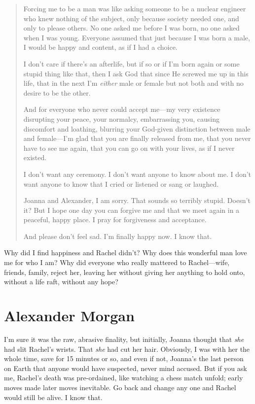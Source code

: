 \begin{quote}
Forcing me to be a man was like asking someone to be a nuclear engineer
who knew nothing of the subject, only because society needed one, and
only to please others. No one asked me before I was born, no one asked
when I was young. Everyone assumed that just because I was born a male,
I would be happy and content, as if I had a choice.

I don't care if there's an afterlife, but if so or if I'm born again or
some stupid thing like that, then I ask God that since He screwed me up
in this life, that in the next I'm \emph{either} male or female but not
both and with no desire to be the other.

And for everyone who never could accept me---my very existence
disrupting your peace, your normalcy, embarrassing you, causing
discomfort and loathing, blurring your God-given distinction between
male and female---I'm glad that you are finally released from me, that
you never have to see me again, that you can go on with your lives, as
if I never existed.

I don't want any ceremony. I don't want anyone to know about me. I don't
want anyone to know that I cried or listened or sang or laughed.

Joanna and Alexander, I am sorry. That sounds so terribly stupid.
Doesn't it? But I hope one day you can forgive me and that we meet again
in a peaceful, happy place. I pray for forgiveness and acceptance.

And please don't feel sad. I'm finally happy now. I know that.
\end{quote}

Why did I find happiness and Rachel didn't? Why does this wonderful man
love me for who I am? Why did everyone who really mattered to
Rachel---wife, friends, family, reject her, leaving her without giving
her anything to hold onto, without a life raft, without any hope?

\chapter{Alexander Morgan}

\titlemark

I'm sure it was the raw, abrasive finality, but initially, Joanna
thought that \emph{she} had slit Rachel's wrists. That \emph{she} had
cut her hair. Obviously, I was with her the whole time, save for 15
minutes or so, and even if not, Joanna's the last person on Earth that
anyone would have suspected, never mind accused. But if you ask me,
Rachel's death was pre-ordained, like watching a chess match unfold;
early moves made later moves inevitable. Go back and change any one and
Rachel would still be alive. I know that.

